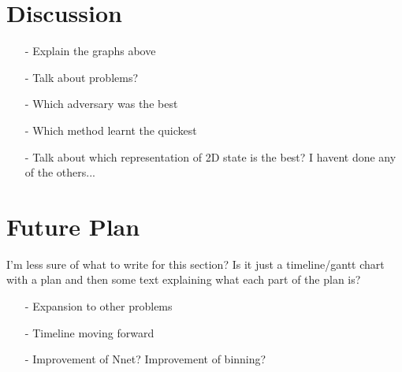 \documentclass[a4paper]{article}
\begin{document}
\section{Discussion}
\begin{itemize}
   \item[-] Explain the graphs above
   \item[-] Talk about problems?
   \item[-] Which adversary was the best
   \item[-] Which method learnt the quickest
   \item[-] Talk about which representation of 2D state is the best? I havent done any of the others...
\end{itemize}

\section{Future Plan}

I'm less sure of what to write for this section? Is it just a timeline/gantt chart with a plan and then some text explaining what each part of the plan is?

\begin{itemize}
   \item[-] Expansion to other problems
   \item[-] Timeline moving forward
   \item[-] Improvement of Nnet? Improvement of binning?
\end{itemize}
\end{document}
